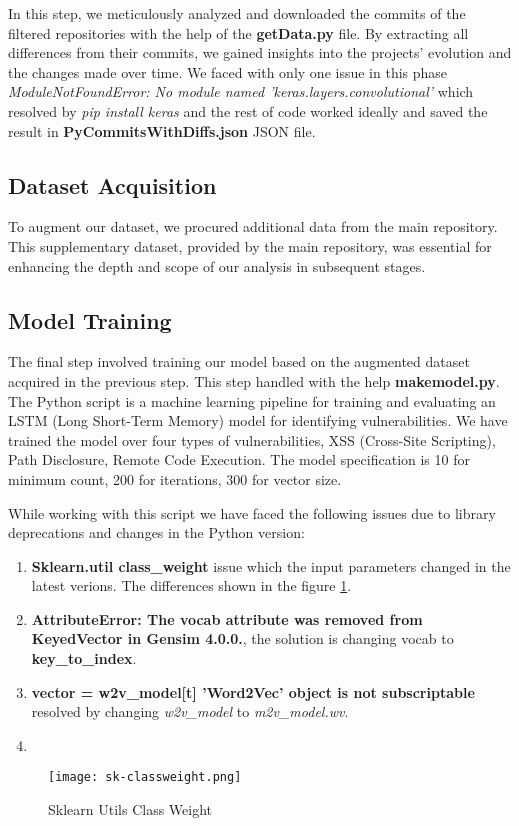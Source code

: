 In this step, we meticulously analyzed and downloaded the commits of the filtered repositories with the help of the \textbf{getData.py} file. 
By extracting all differences from their commits, we gained insights into the projects' evolution and the changes made over time.
We faced with only one issue in this phase \textit{ModuleNotFoundError: No module named 'keras.layers.convolutional'} which resolved by \textit{pip install keras} and the rest of code worked ideally and saved the result in \textbf{PyCommitsWithDiffs.json} JSON file.

\subsection{Dataset Acquisition}

To augment our dataset, we procured additional data from the main repository. 
This supplementary dataset, provided by the main repository, was essential for enhancing the depth and scope of our analysis in subsequent stages.

\subsection{Model Training}

The final step involved training our model based on the augmented dataset acquired in the previous step. This step handled with the help \textbf{makemodel.py}.
The Python script is a machine learning pipeline for training and evaluating an LSTM (Long Short-Term Memory) model for identifying vulnerabilities. 
We have trained the model over four types of vulnerabilities, XSS (Cross-Site Scripting), Path Disclosure, Remote Code Execution. The model specification is 10 for minimum count, 200 for iterations, 300 for vector size.

While working with this script we have faced the following issues due to library deprecations and changes in the Python version:

\begin{enumerate}
    \item \textbf{Sklearn.util class\_weight} issue which the input parameters changed in the latest verions. The differences shown in the figure \ref{fig:sklearn_class_wight}.
    \item \textbf{AttributeError: The vocab attribute was removed from KeyedVector in Gensim 4.0.0.}, the solution is changing vocab to \textbf{key\_to\_index}.
    \item \textbf{vector = w2v\_model[t] 'Word2Vec' object is not subscriptable} resolved by changing \textit{w2v\_model} to \textit{m2v\_model.wv}.
    \item \textbf{}
\end{enumerate}

\begin{figure}
    \centering
    \texttt{[image: sk-classweight.png]}
    \caption{Sklearn Utils Class Weight}
    \label{fig:sklearn_class_wight}
\end{figure}